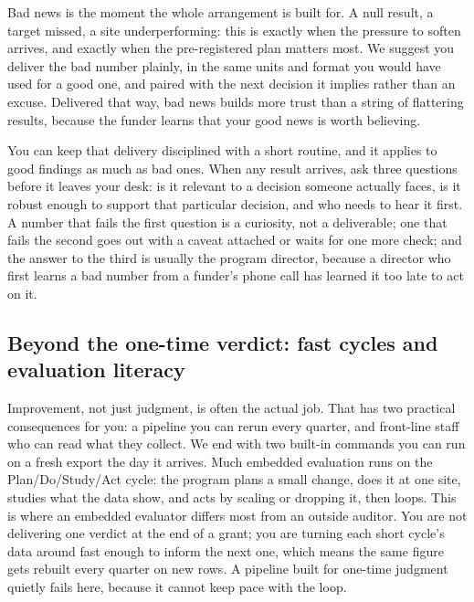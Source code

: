 \documentclass[
    a4paper,
    fontsize=10pt,
    twoside=true,
    numbers=noenddot,
]{kaobook}
\begin{document}
Bad news is the moment the whole arrangement is built for. A null result, a target missed, a site underperforming: this is exactly when the pressure to soften arrives, and exactly when the pre-registered plan matters most. We suggest you deliver the bad number plainly, in the same units and format you would have used for a good one, and paired with the next decision it implies rather than an excuse. Delivered that way, bad news builds more trust than a string of flattering results, because the funder learns that your good news is worth believing.

You can keep that delivery disciplined with a short routine, and it applies to good findings as much as bad ones. When any result arrives, ask three questions before it leaves your desk: is it relevant to a decision someone actually faces, is it robust enough to support that particular decision, and who needs to hear it first. A number that fails the first question is a curiosity, not a deliverable; one that fails the second goes out with a caveat attached or waits for one more check; and the answer to the third is usually the program director, because a director who first learns a bad number from a funder's phone call has learned it too late to act on it.

\subsection{Beyond the one-time verdict: fast cycles and evaluation literacy}\label{sec:ch01-beyond-verdict}
Improvement, not just judgment, is often the actual job. That has two practical consequences for you: a pipeline you can rerun every quarter, and front-line staff who can read what they collect. We end with two built-in commands you can run on a fresh export the day it arrives. Much embedded evaluation runs on the Plan\slash Do\slash Study\slash Act cycle: the program plans a small change, does it at one site, studies what the data show, and acts by scaling or dropping it, then loops. This is where an embedded evaluator differs most from an outside auditor. You are not delivering one verdict at the end of a grant; you are turning each short cycle's data around fast enough to inform the next one, which means the same figure gets rebuilt every quarter on new rows. A pipeline built for one-time judgment quietly fails here, because it cannot keep pace with the loop.
\end{document}

